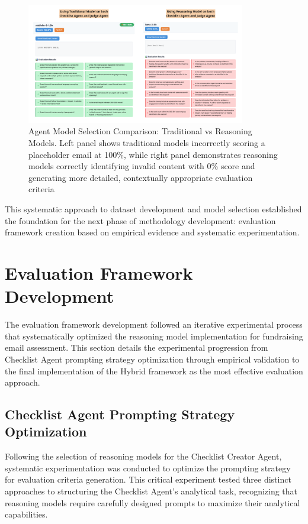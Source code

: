 \begin{figure}[H]
    \centering
    \includegraphics[width=0.85\textwidth]{figures/traditional_vs_reasoning.png}
    \caption[Agent Model Selection Comparison]{Agent Model Selection Comparison: Traditional vs Reasoning Models. Left panel shows traditional models incorrectly scoring a placeholder email at 100\%, while right panel demonstrates reasoning models correctly identifying invalid content with 0\% score and generating more detailed, contextually appropriate evaluation criteria}
    \label{fig:agent-model-comparison}
\end{figure}

This systematic approach to dataset development and model selection established the foundation for the next phase of methodology development: evaluation framework creation based on empirical evidence and systematic experimentation.

\section{Evaluation Framework Development}
\label{sec:evaluation-framework-development}

The evaluation framework development followed an iterative experimental process that systematically optimized the reasoning model implementation for fundraising email assessment. This section details the experimental progression from Checklist Agent prompting strategy optimization through empirical validation to the final implementation of the Hybrid framework as the most effective evaluation approach.

\subsection{Checklist Agent Prompting Strategy Optimization}

Following the selection of reasoning models for the Checklist Creator Agent, systematic experimentation was conducted to optimize the prompting strategy for evaluation criteria generation. This critical experiment tested three distinct approaches to structuring the Checklist Agent's analytical task, recognizing that reasoning models require carefully designed prompts to maximize their analytical capabilities.

